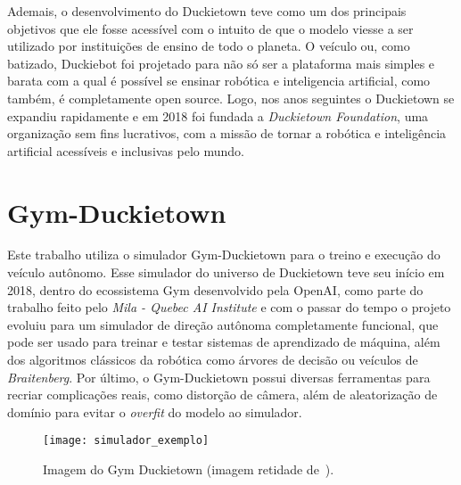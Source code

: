 Ademais, o desenvolvimento do Duckietown teve como um dos principais objetivos que ele fosse acessível com o intuito de que o modelo viesse a ser utilizado por instituições de ensino de todo o planeta. O veículo ou, como batizado, Duckiebot foi projetado para não só ser a plataforma mais simples e barata com a qual é possível se ensinar robótica e inteligencia artificial, como também, é completamente open source. Logo, nos anos seguintes o Duckietown se expandiu rapidamente e em 2018 foi fundada a \emph{Duckietown Foundation}, uma organização sem fins lucrativos, com a missão de tornar a robótica e inteligência artificial acessíveis e inclusivas pelo mundo. 

\section{Gym-Duckietown}

Este trabalho utiliza o simulador Gym-Duckietown\citep{gym-duckietown} para o treino e execução do veículo autônomo. Esse simulador do universo de Duckietown teve seu início em 2018, dentro do ecossistema Gym desenvolvido pela OpenAI\citep{1606.01540}, como parte do trabalho feito pelo \textit{Mila - Quebec AI Institute} e com o passar do tempo o projeto evoluiu para um simulador de direção autônoma completamente funcional, que pode ser usado para treinar e testar sistemas de aprendizado de máquina, além dos algoritmos clássicos da robótica como árvores de decisão ou veículos de \textit{Braitenberg}. Por último, o Gym-Duckietown possui diversas ferramentas para recriar complicações reais, como distorção de câmera, além de aleatorização de domínio para evitar o \textit{overfit} do modelo ao simulador.

\begin{figure}
	\centering
	\texttt{[image: simulador\_exemplo]}
	\caption{Imagem do Gym Duckietown (imagem retidade de~\citep{gym-duckietown}).\label{fig:simulador_exemplo}}
\end{figure}


